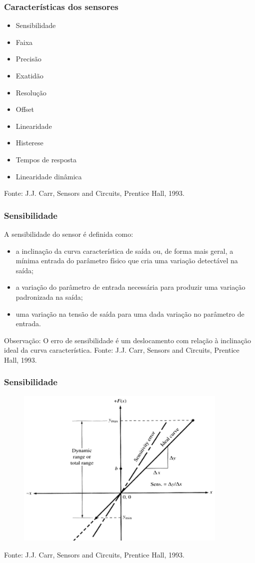 \documentclass[t]{beamer}
\begin{document}
\begin{frame}
	\frametitle{Características dos sensores}
	\begin{itemize}
		\item Sensibilidade
		\item Faixa
		\item Precisão
		\item Exatidão
		\item Resolução
		\item Offset
		\item Linearidade
		\item Histerese
		\item Tempos de resposta
		\item Linearidade dinâmica
	\end{itemize}
	{\scriptsize Fonte: J.J. Carr, Sensors and Circuits, Prentice Hall, 1993.}
\end{frame}

\begin{frame}
	\frametitle{Sensibilidade}
	A sensibilidade do sensor é definida como:
	 \begin{itemize}
	 	\item a inclinação da curva característica de saída ou, de forma mais geral, a mínima entrada do parâmetro físico que cria uma variação detectável na saída;
	 	\item a variação do parâmetro de entrada necessária para produzir uma variação padronizada na saída;
	 	\item uma variação na tensão de saída para uma dada variação no parâmetro de entrada.
	 \end{itemize}	
 	 Observação: O erro de sensibilidade é um deslocamento com relação à inclinação ideal da curva característica.
	{\scriptsize Fonte: J.J. Carr, Sensors and Circuits, Prentice Hall, 1993.}
\end{frame}

\begin{frame}
	\frametitle{Sensibilidade}
	\begin{figure}
		\includegraphics[width=0.9\textwidth]{sensibilidade}
	\end{figure}
	{\scriptsize Fonte: J.J. Carr, Sensors and Circuits, Prentice Hall, 1993.}
\end{frame}
\end{document}
